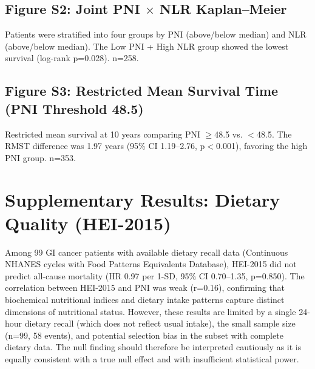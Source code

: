 \documentclass[11pt,a4paper]{article}
\begin{document}
\subsection*{Figure S2: Joint PNI $\times$ NLR Kaplan--Meier}
Patients were stratified into four groups by PNI (above/below median) and NLR (above/below median). The Low PNI + High NLR group showed the lowest survival (log-rank p=0.028). n=258.

\subsection*{Figure S3: Restricted Mean Survival Time (PNI Threshold 48.5)}
Restricted mean survival at 10 years comparing PNI $\ge$48.5 vs. $<$48.5. The RMST difference was 1.97 years (95\% CI 1.19--2.76, p$<$0.001), favoring the high PNI group. n=353.

\section*{Supplementary Results: Dietary Quality (HEI-2015)}
\label{sec:hei}

Among 99 GI cancer patients with available dietary recall data (Continuous NHANES cycles with Food Patterns Equivalents Database), HEI-2015 did not predict all-cause mortality (HR 0.97 per 1-SD, 95\% CI 0.70--1.35, p=0.850). The correlation between HEI-2015 and PNI was weak (r=0.16), confirming that biochemical nutritional indices and dietary intake patterns capture distinct dimensions of nutritional status. However, these results are limited by a single 24-hour dietary recall (which does not reflect usual intake), the small sample size (n=99, 58 events), and potential selection bias in the subset with complete dietary data. The null finding should therefore be interpreted cautiously as it is equally consistent with a true null effect and with insufficient statistical power.
\end{document}
